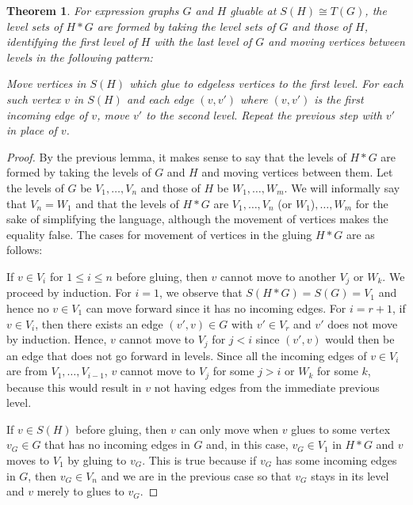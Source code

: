 \documentclass{amsart}
\newcommand{\li}[1][]{\ifthenelse{\equal{#1}{}}{\item}{\item \label{#1}}}
\newenvironment{enmrt}{
  \enumerate[(i)]
  \setlength{\itemsep}{0pt}
}{
  \endenumerate
}
\newtheorem{thm}{Theorem}
\numberwithin{thm}{section}
\theoremstyle{definition}
\begin{document}
\begin{thm}
For expression graphs $G$ and $H$ gluable at $S(H) \cong T(G)$,
the level sets of $H * G$ are formed by taking the level sets of $G$ and those
of $H$, identifying the first level of $H$ with the last level of $G$ and moving
vertices between levels in the following pattern:
\begin{enmrt}
\li Move vertices in $S(H)$ which glue to edgeless vertices to the first level.
\li For each such vertex $v$ in $S(H)$ and each edge $(v, v')$ where $(v, v')$
is the first incoming edge of $v$, move $v'$ to the second level.
\li Repeat the previous step with $v'$ in place of $v$.
\end{enmrt}
\end{thm}
\begin{proof}
By the previous lemma, it makes sense to say that the levels of $H * G$ are
formed by taking the levels of
$G$ and $H$ and moving vertices between them. Let the levels of $G$ be $V_1,
\dots, V_n$ and those of $H$ be $W_1, \dots, W_m$. We will informally say that
$V_n = W_1$ and that the levels of $H * G$ are
$V_1, \dots, V_n $ (or $W_1$)$, \dots, W_m$ for the sake of simplifying the
language, although the movement of vertices makes the equality false. The cases
for movement of vertices in the gluing $H * G$ are as follows:
\begin{enmrt}
\li If $v \in V_i$ for $1 \leq i \leq n$ before gluing, then $v$ cannot move to
another $V_j$ or $W_k$.
We proceed by induction. For $i = 1$, we observe that $S(H * G) = S(G) = V_1$
and hence no $v \in V_1$ can move forward since it has no incoming edges. For
$i = r + 1$, if $v \in V_i$, then there exists an edge $(v', v) \in G$ with
$v' \in V_{r}$ and $v'$ does not move by induction. Hence, $v$ cannot move to
$V_j$ for $j < i$ since $(v', v)$ would then be an edge that does not go forward
in levels. Since all the incoming edges of $v \in V_i$ are from
$V_1, \dots, V_{i - 1}$, $v$ cannot move to $V_j$ for some $j > i$ or $W_k$ for
some $k$, because this would result in $v$ not having edges from the immediate
previous level.

\li If $v \in S(H)$ before gluing, then $v$ can only move when $v$ glues to some
vertex $v_G \in G$ that has no incoming edges in $G$ and, in this case,
$v_G \in V_1$ in $H * G$ and $v$ moves to $V_1$ by gluing to $v_G$. This is true
because if $v_G$ has some incoming edges in $G$, then $v_G \in V_n$ and we are
in the previous case so that $v_G$ stays in its level and $v$ merely to glues to
$v_G$.


\end{enmrt}
\end{proof}
\end{document}
